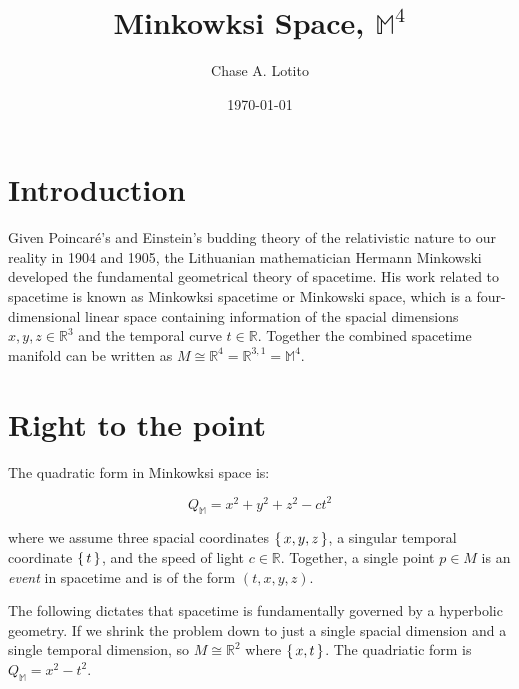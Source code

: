 \documentclass{article}
\title{Minkowksi Space, \(\mathbb{M}^4\)}
\author{Chase A. Lotito}
\date{\today}
\begin{document}
\maketitle

\section{Introduction}

Given Poincar\'e's and Einstein's budding theory of the relativistic nature to our reality in 1904 and 1905, the Lithuanian mathematician Hermann Minkowski developed the fundamental geometrical theory of spacetime. His work related to spacetime is known as Minkowksi spacetime or Minkowski space, which is a four-dimensional linear space containing information of the spacial dimensions \({x,y,z}\in\mathbb{R}^3\) and the temporal curve \({t}\in\mathbb{R}\). Together the combined spacetime manifold can be written as \(M \cong \mathbb{R}^4 = \mathbb{R}^{3,1} = \mathbb{M}^4 \).

\section{Right to the point}

The quadratic form in Minkowksi space is:

\begin{equation}
    Q_{\mathbb{M}} = x^2 + y^2 +z^2 - c t^2
\end{equation}

\noindent
where we assume three spacial coordinates \( \set{x,y,z} \), a singular temporal coordinate \(\set{t}\), and the speed of light \(c \in  \mathbb{R}\). Together, a single point \(p\in M\) is an \emph{event} in spacetime and is of the form \((t,x,y,z)\).

\smallskip
\noindent
The following dictates that spacetime is fundamentally governed by a hyperbolic geometry. If we shrink the problem down to just a single spacial dimension and a single temporal dimension, so \(M\cong \mathbb{R}^2\) where \(\set{x,t}\). The quadriatic form is \(Q_{\mathbb{M}}=x^2-t^2\).
\end{document}
